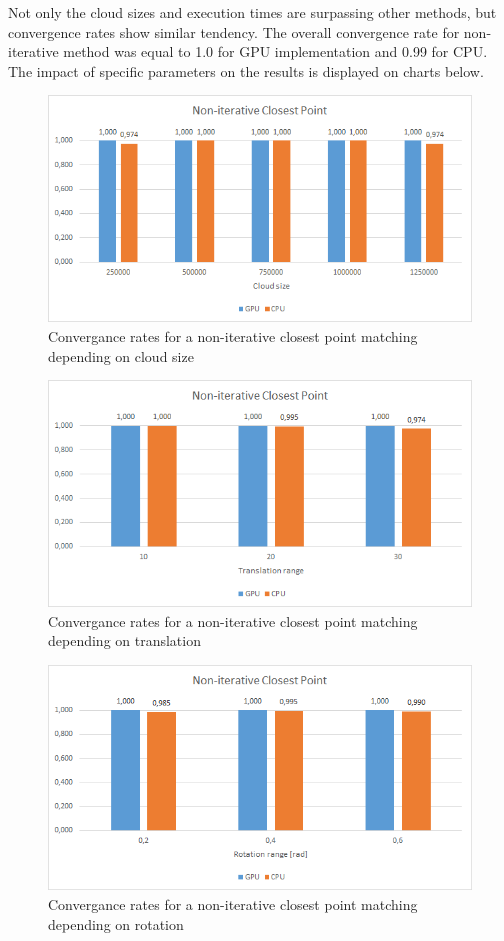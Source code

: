 \documentclass[titlepage]{article}
\begin{document}
Not only the cloud sizes and execution times are surpassing other methods, but convergence rates show similar tendency. The overall convergence rate for non-iterative method was equal to 1.0 for GPU implementation and 0.99 for CPU. The impact of specific parameters on the results is displayed on charts below.
\begin{figure}[H]
\includegraphics[width=\textwidth]{ss-nicp-1.png}
\caption{Convergance rates for a non-iterative closest point matching depending on cloud size}
\end{figure}
\begin{figure}[H]
\includegraphics[width=\textwidth]{ss-nicp-2.png}
\caption{Convergance rates for a non-iterative closest point matching depending on translation}
\end{figure}
\begin{figure}[H]
\includegraphics[width=\textwidth]{ss-nicp-3.png}
\caption{Convergance rates for a non-iterative closest point matching depending on rotation}
\end{figure}
\end{document}
